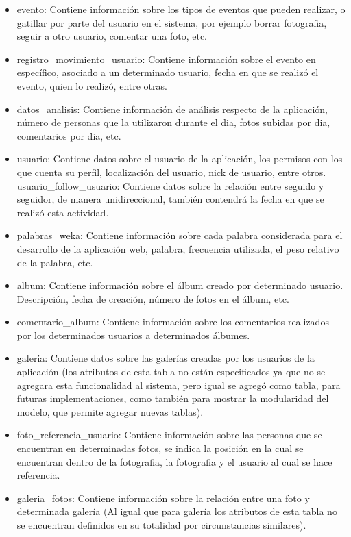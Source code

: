 \documentclass{memoria}
\begin{document}
\begin{itemize}
	\item evento: Contiene información sobre los tipos de eventos que pueden realizar, o gatillar por parte del usuario en el sistema, por ejemplo borrar fotografia, seguir a otro usuario, comentar una foto, etc.
	\item registro\_movimiento\_usuario: Contiene información sobre el evento en específico, asociado a un determinado usuario, fecha en que se realizó el evento, quien lo realizó, entre otras.
	\item datos\_analisis: Contiene información de análisis respecto de la aplicación, número de personas que la utilizaron durante el dia, fotos subidas por dia, comentarios por dia, etc.
	\item usuario: Contiene datos sobre el usuario de la aplicación, los permisos con los que cuenta su perfil, localización del usuario, nick de usuario, entre otros.
	usuario\_follow\_usuario: Contiene datos sobre la relación entre seguido y seguidor, de manera unidireccional, también contendrá la fecha en que se realizó esta actividad.
	\item palabras\_weka: Contiene información sobre cada palabra considerada para el desarrollo de la aplicación web, palabra, frecuencia utilizada, el peso relativo de la palabra, etc.
	\item album: Contiene información sobre el álbum creado por determinado usuario. Descripción, fecha de creación, número de fotos en el álbum, etc.
	\item comentario\_album: Contiene información sobre los comentarios realizados por los determinados usuarios a determinados álbumes.
	\item galeria: Contiene datos sobre las galerías creadas por los usuarios de la aplicación (los atributos de esta tabla no están especificados ya que no se agregara esta funcionalidad al sistema, pero igual se agregó como tabla, para futuras implementaciones, como también para mostrar la modularidad del modelo, que permite agregar nuevas tablas).
	\item foto\_referencia\_usuario: Contiene información sobre las personas que se encuentran en determinadas fotos, se indica la posición en la cual se encuentran dentro de la fotografia, la fotografia y el usuario al cual se hace referencia.
	\item galeria\_fotos: Contiene información sobre la relación entre una foto y determinada galería (Al igual que para galería los atributos de esta tabla no se encuentran definidos en su totalidad por circunstancias similares).

\end{itemize}
\end{document}
